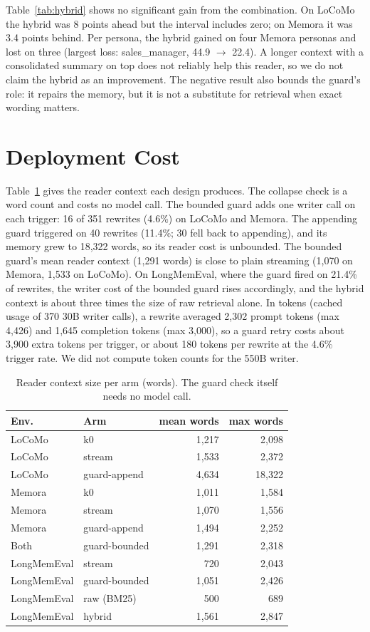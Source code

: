 \documentclass[11pt]{article}
\begin{document}
Table~\ref{tab:hybrid} shows no significant gain from the combination. On LoCoMo the hybrid was 8 points ahead but the interval includes zero; on Memora it was 3.4 points behind. Per persona, the hybrid gained on four Memora personas and lost on three (largest loss: sales\_manager, 44.9 $\rightarrow$ 22.4). A longer context with a consolidated summary on top does not reliably help this reader, so we do not claim the hybrid as an improvement. The negative result also bounds the guard's role: it repairs the memory, but it is not a substitute for retrieval when exact wording matters.

\section{Deployment Cost}\label{sec:cost}
Table~\ref{tab:cost} gives the reader context each design produces. The collapse check is a word count and costs no model call. The bounded guard adds one writer call on each trigger: 16 of 351 rewrites (4.6\%) on LoCoMo and Memora. The appending guard triggered on 40 rewrites (11.4\%; 30 fell back to appending), and its memory grew to 18,322 words, so its reader cost is unbounded. The bounded guard's mean reader context (1,291 words) is close to plain streaming (1,070 on Memora, 1,533 on LoCoMo). On LongMemEval, where the guard fired on 21.4\% of rewrites, the writer cost of the bounded guard rises accordingly, and the hybrid context is about three times the size of raw retrieval alone. In tokens (cached usage of 370 30B writer calls), a rewrite averaged 2,302 prompt tokens (max 4,426) and 1,645 completion tokens (max 3,000), so a guard retry costs about 3,900 extra tokens per trigger, or about 180 tokens per rewrite at the 4.6\% trigger rate. We did not compute token counts for the 550B writer.

\begin{table}[t]
\centering\small
\setlength{\tabcolsep}{2.5pt}
\begin{tabular}{llrr}
\toprule
Env. & Arm & mean words & max words \\
\midrule
LoCoMo & k0 & 1,217 & 2,098 \\
LoCoMo & stream & 1,533 & 2,372 \\
LoCoMo & guard-append & 4,634 & 18,322 \\
Memora & k0 & 1,011 & 1,584 \\
Memora & stream & 1,070 & 1,556 \\
Memora & guard-append & 1,494 & 2,252 \\
Both & guard-bounded & 1,291 & 2,318 \\
LongMemEval & stream & 720 & 2,043 \\
LongMemEval & guard-bounded & 1,051 & 2,426 \\
LongMemEval & raw (BM25) & 500 & 689 \\
LongMemEval & hybrid & 1,561 & 2,847 \\
\bottomrule
\end{tabular}
\caption{Reader context size per arm (words). The guard check itself needs no model call.}
\label{tab:cost}
\end{table}
\end{document}
